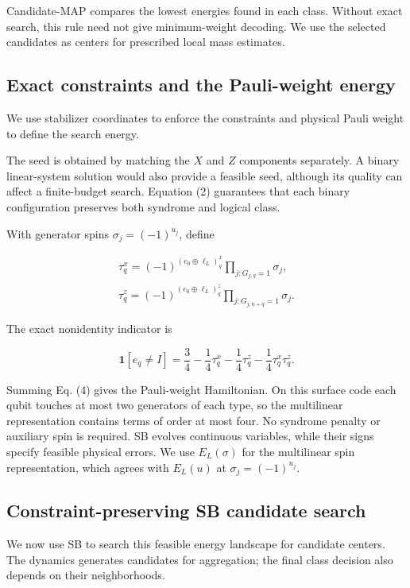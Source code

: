 \documentclass[aps,prapplied,reprint,superscriptaddress,amsmath,amssymb,floatfix,nofootinbib]{revtex4-2}
\begin{document}
Candidate-MAP compares the lowest energies found in each class. Without
exact search, this rule need not give minimum-weight decoding. We use
the selected candidates as centers for prescribed local mass estimates.

\subsection{Exact constraints and the Pauli-weight
energy}\label{b.-exact-constraints-and-the-pauli-weight-energy}

We use stabilizer coordinates to enforce the constraints and physical
Pauli weight to define the search energy.

The seed is obtained by matching the \(X\) and \(Z\) components
separately. A binary linear-system solution would also provide a
feasible seed, although its quality can affect a finite-budget search.
Equation (2) guarantees that each binary configuration preserves both
syndrome and logical class.

With generator spins \(\sigma_j=(-1)^{u_j}\), define

\[
\begin{gathered}
\tau_q^x=(-1)^{(e_0\oplus\ell_L)_q^x}
\prod_{j:G_{j,q}=1}\sigma_j,
\\
\tau_q^z=(-1)^{(e_0\oplus\ell_L)_q^z}
\prod_{j:G_{j,n+q}=1}\sigma_j.
\end{gathered}
\]

The exact nonidentity indicator is

\[
\mathbf1[e_q\ne I]
=\frac34-\frac14\tau_q^x-\frac14\tau_q^z
-\frac14\tau_q^x\tau_q^z.
\tag{4}\label{eq:4}
\]

Summing Eq. (4) gives the Pauli-weight Hamiltonian. On this surface code
each qubit touches at most two generators of each type, so the
multilinear representation contains terms of order at most four. No
syndrome penalty or auxiliary spin is required. SB evolves continuous
variables, while their signs specify feasible physical errors. We use
\(E_L(\sigma)\) for the multilinear spin representation, which agrees
with \(E_L(u)\) at \(\sigma_j=(-1)^{u_j}\).

\subsection{Constraint-preserving SB candidate
search}\label{c.-constraint-preserving-sb-candidate-search}

We now use SB to search this feasible energy landscape for candidate
centers. The dynamics generates candidates for aggregation; the final
class decision also depends on their neighborhoods.
\end{document}
